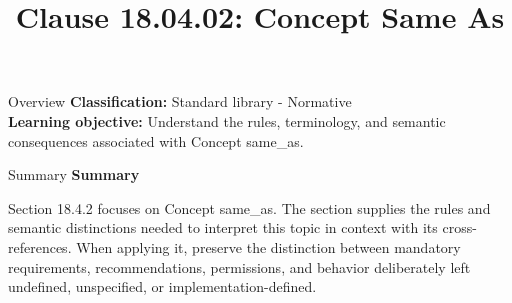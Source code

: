 \documentclass[10pt,letterpaper]{article}
\title{Clause 18.04.02: Concept Same As}
\author{}
\date{}
\begin{document}
\maketitle
\begin{CornellOverviewBox}{Overview}
\textbf{Classification:} Standard library - Normative\\[2pt]
\textbf{Learning objective:} Understand the rules, terminology, and semantic consequences associated with Concept same\_as.
\end{CornellOverviewBox}\begin{CornellSummaryBox}{Summary}
{\sffamily\bfseries\color{Accent} Summary}\par\vspace{3pt}Section 18.4.2 focuses on Concept same\_as. The section supplies the rules and semantic distinctions needed to interpret this topic in context with its cross-references. When applying it, preserve the distinction between mandatory requirements, recommendations, permissions, and behavior deliberately left undefined, unspecified, or implementation-defined.
\end{CornellSummaryBox}
\end{document}
